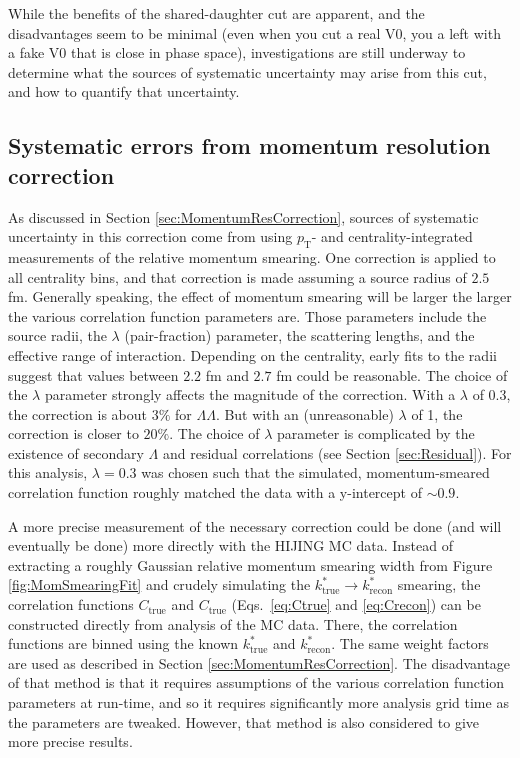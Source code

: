 While the benefits of the shared-daughter cut are apparent,
and the disadvantages seem to be minimal (even when you cut a real V0, you a left with a fake V0 that is close in phase space), investigations are still underway to determine what the sources of systematic uncertainty may arise from this cut, and how to quantify that uncertainty.

\subsection{Systematic errors from momentum resolution correction}
\label{sec:MomentumResCorrectionsSys}

As discussed in Section \ref{sec:MomentumResCorrection}, sources of systematic uncertainty in this correction come from using $p_\mathrm{T}$- and centrality-integrated measurements of the relative momentum smearing.  One correction is applied to all centrality bins, and that correction is made assuming a source radius of $2.5$ fm. Generally speaking, the effect of momentum smearing will be larger the larger the various correlation function parameters are.  Those parameters include the source radii, the $\lambda$ (pair-fraction) parameter, the scattering lengths, and the effective range of interaction.  Depending on the centrality, early fits to the radii suggest that values between $2.2$ fm and $2.7$ fm could be reasonable.  The choice of the $\lambda$ parameter strongly affects the magnitude of the correction.  With a $\lambda$ of 0.3, the correction is about $3\%$ for $\Lambda\Lambda$.  But with an (unreasonable) $\lambda$ of 1, the correction is closer to $20\%$.  The choice of $\lambda$ parameter is complicated by the existence of secondary $\Lambda$ and residual correlations (see Section \ref{sec:Residual}).  For this analysis, $\lambda = 0.3$ was chosen such that the simulated, momentum-smeared correlation function roughly matched the data with a y-intercept of $\sim 0.9$.

A more precise measurement of the necessary correction could be done (and will eventually be done) more directly with the HIJING MC data.  Instead of extracting a roughly Gaussian relative momentum smearing width from Figure \ref{fig:MomSmearingFit} and crudely simulating the $k^*_{\mathrm{true}} \rightarrow k^*_{\mathrm{recon}}$ smearing, the correlation functions $C_{\mathrm{true}}$ and  $C_{\mathrm{true}}$ (Eqs.\ \ref{eq:Ctrue} and \ref{eq:Crecon}) can be constructed directly from analysis of the MC data.  There, the correlation functions are binned using the known $k^*_{\mathrm{true}}$ and $k^*_{\mathrm{recon}}$.  The same weight factors are used as described in Section \ref{sec:MomentumResCorrection}.  The disadvantage of that method is that it requires assumptions of the various correlation function parameters at run-time, and so it requires significantly more analysis grid time as the parameters are tweaked.  However, that method is also considered to give more precise results.

